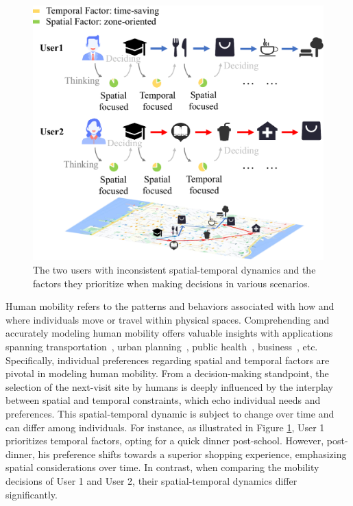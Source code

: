 \documentclass[letterpaper]{article} %
\begin{document}
\begin{figure}[t]
\centering
\includegraphics[width=\linewidth]{introduction.pdf}
\caption{The two users with inconsistent spatial-temporal dynamics and the factors they prioritize when making decisions in various scenarios.}
\label{fig1}
\end{figure}

Human mobility refers to the patterns and behaviors associated with how and where individuals move or travel within physical spaces.
Comprehending and accurately modeling human mobility offers valuable insights with applications spanning transportation~\cite{wang2020incremental}, urban planning~\cite{wang2018learning,wang2020reimagining}, public health~\cite{qureshi2021equitable}, business~\cite{antoniou2012human}, etc.
Specifically, individual preferences regarding spatial and temporal factors are pivotal in modeling human mobility.
From a decision-making standpoint, the selection of the next-visit site by humans is deeply influenced by the interplay between spatial and temporal constraints, which echo individual needs and preferences.
This spatial-temporal dynamic is subject to change over time and can differ among individuals.
For instance, as illustrated in Figure \ref{fig1}, User 1 prioritizes temporal factors, opting for a quick dinner post-school.
However, post-dinner, his preference shifts towards a superior shopping experience, emphasizing spatial considerations over time.
In contrast, when comparing the mobility decisions of User 1 and User 2, their spatial-temporal dynamics differ significantly.
\end{document}
